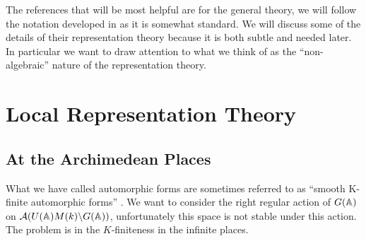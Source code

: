 The references that will be most helpful are \cite[I.II]{borelAutomorphicFormsRepresentations1979}\cite{getzIntroductionAutomorphicRepresentations2024} for the general theory, we will follow the notation developed in \cite{moeglinSpectralDecompositionEisenstein1995} as it is somewhat standard. We will discuss some of the details of their representation theory because it is both subtle and needed later. In particular we want to draw attention to what we think of as the ``non-algebraic'' nature of the representation theory.
\section{Local Representation Theory}
\subsection{At the Archimedean Places}
What we have called automorphic forms are sometimes referred to as ``smooth K-finite automorphic forms'' \cite[2.2]{cogdellLecturesLfunctionsConverse}.
We want to consider the right regular action of \(G(\A)\) on \(\mathcal{A}(U(\A)M(k)\backslash G(\A))\), unfortunately this space is not stable under this action. The problem is in the \(K\)-finiteness in the infinite places. 

